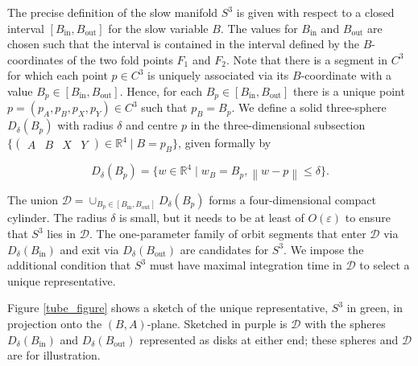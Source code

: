 \documentclass{ws-ijbc}
\begin{document}
The precise definition of the slow manifold $S^3$ is given with respect to a closed interval $[B_{\mathrm{in}},B_{\mathrm{out}}]$ for the slow variable $B$.  The values for $B_{\mathrm{in}}$ and $B_{\mathrm{out}}$ are chosen such that the interval is contained in the interval defined by the $B$-coordinates of the two fold points $F_1$ and $F_2$.  Note that there is a segment in $C^3$ for which each point $p \in C^3$ is uniquely associated via its $B$-coordinate with a value $B_p \in [B_{\mathrm{in}},B_{\mathrm{out}}]$.  Hence, for each $B_p \in [B_{\mathrm{in}},B_{\mathrm{out}}]$ there is a unique point $p=(p_A,p_B,p_X,p_Y) \in C^3$ such that $p_B = B_p$.  We define a solid three-sphere $D_\delta(B_p)$ with radius $\delta$ and centre $p$ in the three-dimensional subsection $\{ \begin{pmatrix} A & B & X & Y \end{pmatrix} \in \mathbb{R}^4 \; | \; B=p_B\}$, given formally by

\begin{equation*}
D_\delta(B_p)=\{w \in \mathbb{R}^4 \; | \; w_B = B_p, \left\lVert w-p \right\rVert \leq \delta\}.
\end{equation*}
    
\noindent
The union $\mathscr{D} = \cup_{B_p \in [B_{\mathrm{in}}, B_{\mathrm{out}}]} D_\delta(B_p)$ forms a four-dimensional compact cylinder.  The radius $\delta$ is small, but it needs to be at least of $O(\varepsilon)$ to ensure that $S^3$ lies in $\mathscr{D}$.  The one-parameter family of orbit segments that enter $\mathscr{D}$ via $D_\delta(B_{\mathrm{in}})$ and exit via $D_\delta(B_{\mathrm{out}})$ are candidates for $S^3$.   We impose the additional condition that $S^3$ must have maximal integration time in $\mathscr{D}$ to select a unique representative.
    
Figure \ref{tube_figure} shows a sketch of the unique representative, $S^3$ in green, in projection onto the $(B,A)$-plane.  Sketched in purple is $\mathscr{D}$ with the spheres $D_\delta(B_{\mathrm{in}})$ and $D_\delta(B_{\mathrm{out}})$ represented as disks at either end; these spheres and $\mathscr{D}$ are for illustration.
\end{document}
